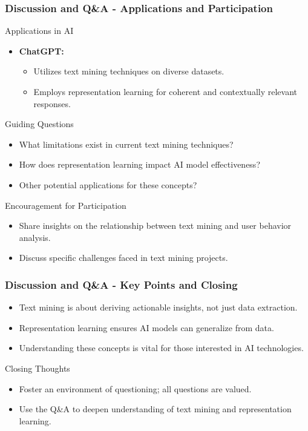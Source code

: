 \documentclass[aspectratio=169]{beamer}
\begin{document}
\begin{frame}[fragile]
  \frametitle{Discussion and Q\&A - Applications and Participation}
  \begin{block}{Applications in AI}
    \begin{itemize}
      \item \textbf{ChatGPT:}
        \begin{itemize}
          \item Utilizes text mining techniques on diverse datasets.
          \item Employs representation learning for coherent and contextually relevant responses.
        \end{itemize}
    \end{itemize}
  \end{block}

  \begin{block}{Guiding Questions}
    \begin{itemize}
      \item What limitations exist in current text mining techniques?
      \item How does representation learning impact AI model effectiveness?
      \item Other potential applications for these concepts?
    \end{itemize}
  \end{block}

  \begin{block}{Encouragement for Participation}
    \begin{itemize}
      \item Share insights on the relationship between text mining and user behavior analysis.
      \item Discuss specific challenges faced in text mining projects.
    \end{itemize}
  \end{block}
\end{frame}

\begin{frame}[fragile]
  \frametitle{Discussion and Q\&A - Key Points and Closing}
  \begin{itemize}
    \item Text mining is about deriving actionable insights, not just data extraction.
    \item Representation learning ensures AI models can generalize from data.
    \item Understanding these concepts is vital for those interested in AI technologies.
  \end{itemize}

  \begin{block}{Closing Thoughts}
    \begin{itemize}
      \item Foster an environment of questioning; all questions are valued.
      \item Use the Q\&A to deepen understanding of text mining and representation learning.
    \end{itemize}
  \end{block}
\end{frame}
\end{document}
